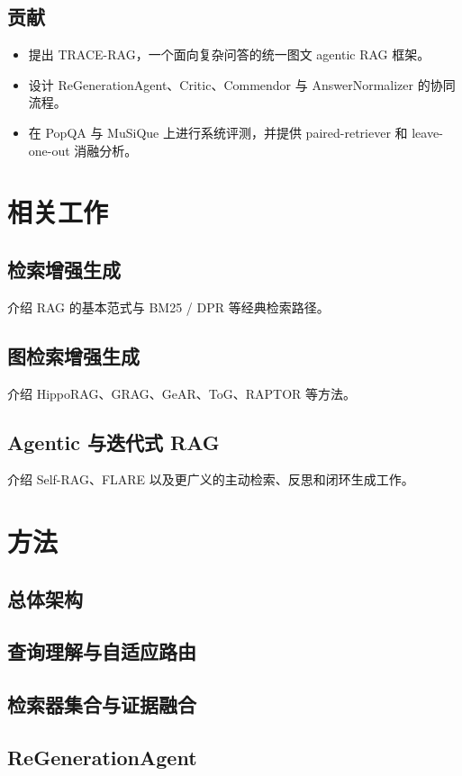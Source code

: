 ﻿\documentclass[UTF8,11pt,twocolumn]{ctexart}
\begin{document}
\subsection*{贡献}
\begin{itemize}[leftmargin=1.5em]
  \item 提出 TRACE-RAG，一个面向复杂问答的统一图文 agentic RAG 框架。
  \item 设计 ReGenerationAgent、Critic、Commendor 与 AnswerNormalizer 的协同流程。
  \item 在 PopQA 与 MuSiQue 上进行系统评测，并提供 paired-retriever 和 leave-one-out 消融分析。
\end{itemize}

\section{相关工作}

\subsection{检索增强生成}
介绍 RAG 的基本范式与 BM25 / DPR 等经典检索路径。

\subsection{图检索增强生成}
介绍 HippoRAG、GRAG、GeAR、ToG、RAPTOR 等方法。

\subsection{Agentic 与迭代式 RAG}
介绍 Self-RAG、FLARE 以及更广义的主动检索、反思和闭环生成工作。

\section{方法}
\subsection{总体架构}
\subsection{查询理解与自适应路由}
\subsection{检索器集合与证据融合}
\subsection{ReGenerationAgent}
\end{document}
